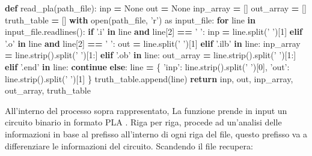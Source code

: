 \documentclass[italian,]{book}
\newenvironment{Shaded}{\begin{snugshade}}{\end{snugshade}}
\newcommand{\BuiltInTok}[1]{#1}
\newcommand{\ControlFlowTok}[1]{\textcolor[rgb]{0.13,0.29,0.53}{\textbf{#1}}}
\newcommand{\DecValTok}[1]{\textcolor[rgb]{0.00,0.00,0.81}{#1}}
\newcommand{\ImportTok}[1]{#1}
\newcommand{\KeywordTok}[1]{\textcolor[rgb]{0.13,0.29,0.53}{\textbf{#1}}}
\newcommand{\NormalTok}[1]{#1}
\newcommand{\OperatorTok}[1]{\textcolor[rgb]{0.81,0.36,0.00}{\textbf{#1}}}
\newcommand{\StringTok}[1]{\textcolor[rgb]{0.31,0.60,0.02}{#1}}
\newcommand{\VariableTok}[1]{\textcolor[rgb]{0.00,0.00,0.00}{#1}}
\begin{document}
\begin{Shaded}
\begin{Highlighting}[]
\KeywordTok{def}\NormalTok{ read_pla(path_file):}
\NormalTok{  inp }\OperatorTok{=} \VariableTok{None}
\NormalTok{  out }\OperatorTok{=} \VariableTok{None}
\NormalTok{  inp_array }\OperatorTok{=}\NormalTok{ []}
\NormalTok{  out_array }\OperatorTok{=}\NormalTok{ []}
\NormalTok{  truth_table }\OperatorTok{=}\NormalTok{ []}
  \ControlFlowTok{with} \BuiltInTok{open}\NormalTok{(path_file, }\StringTok{'r'}\NormalTok{) }\ImportTok{as}\NormalTok{ input_file:}
    \ControlFlowTok{for}\NormalTok{ line }\KeywordTok{in}\NormalTok{ input_file.readlines():}
      \ControlFlowTok{if} \StringTok{'.i'} \KeywordTok{in}\NormalTok{ line }\KeywordTok{and}\NormalTok{ line[}\DecValTok{2}\NormalTok{] }\OperatorTok{==} \StringTok{' '}\NormalTok{:}
\NormalTok{        inp }\OperatorTok{=}\NormalTok{ line.split(}\StringTok{' '}\NormalTok{)[}\DecValTok{1}\NormalTok{]}
      \ControlFlowTok{elif} \StringTok{'.o'} \KeywordTok{in}\NormalTok{ line }\KeywordTok{and}\NormalTok{ line[}\DecValTok{2}\NormalTok{] }\OperatorTok{==} \StringTok{' '}\NormalTok{:}
\NormalTok{        out }\OperatorTok{=}\NormalTok{ line.split(}\StringTok{' '}\NormalTok{)[}\DecValTok{1}\NormalTok{]}
      \ControlFlowTok{elif} \StringTok{'.ilb'} \KeywordTok{in}\NormalTok{ line:}
\NormalTok{        inp_array }\OperatorTok{=}\NormalTok{ line.strip().split(}\StringTok{' '}\NormalTok{)[}\DecValTok{1}\NormalTok{:]}
      \ControlFlowTok{elif} \StringTok{'.ob'} \KeywordTok{in}\NormalTok{ line:}
\NormalTok{        out_array }\OperatorTok{=}\NormalTok{ line.strip().split(}\StringTok{' '}\NormalTok{)[}\DecValTok{1}\NormalTok{:]}
      \ControlFlowTok{elif} \StringTok{'.end'} \KeywordTok{in}\NormalTok{ line:}
        \ControlFlowTok{continue}
      \ControlFlowTok{else}\NormalTok{:}
\NormalTok{        line }\OperatorTok{=}\NormalTok{ \{}
          \StringTok{'inp'}\NormalTok{:  line.strip().split(}\StringTok{' '}\NormalTok{)[}\DecValTok{0}\NormalTok{],}
          \StringTok{'out'}\NormalTok{:  line.strip().split(}\StringTok{' '}\NormalTok{)[}\DecValTok{1}\NormalTok{]}
\NormalTok{        \}}
\NormalTok{        truth_table.append(line)}
  \ControlFlowTok{return}\NormalTok{ inp, out, inp_array, out_array, truth_table}
\end{Highlighting}
\end{Shaded}

All'interno del processo sopra rappresentato, La funzione prende in input un circuito binario in formato PLA . Riga per riga, procede ad un'analisi delle informazioni in base al prefisso all'interno di ogni riga del file, questo prefisso va a differenziare le informazioni del circuito. Scandendo il file recupera:
\end{document}
